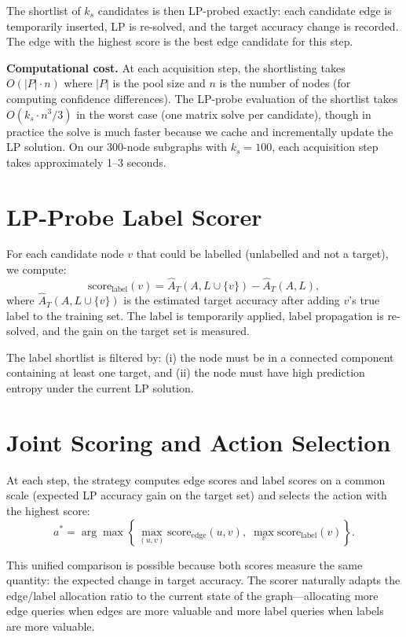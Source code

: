 \documentclass[12pt,a4paper,oneside]{report}
\begin{document}
The shortlist of $k_s$ candidates is then LP-probed exactly: each candidate edge is temporarily inserted, LP is re-solved, and the target accuracy change is recorded. The edge with the highest score is the best edge candidate for this step.

\textbf{Computational cost.} At each acquisition step, the shortlisting takes $O(|P| \cdot n)$ where $|P|$ is the pool size and $n$ is the number of nodes (for computing confidence differences). The LP-probe evaluation of the shortlist takes $O(k_s \cdot n^3 / 3)$ in the worst case (one matrix solve per candidate), though in practice the solve is much faster because we cache and incrementally update the LP solution. On our 300-node subgraphs with $k_s = 100$, each acquisition step takes approximately 1--3 seconds.

\section{LP-Probe Label Scorer}

For each candidate node $v$ that could be labelled (unlabelled and not a target), we compute:
\begin{equation}
    \text{score}_{\text{label}}(v) = \hat{A}_T(A, L \cup \{v\}) - \hat{A}_T(A, L),
\end{equation}
where $\hat{A}_T(A, L \cup \{v\})$ is the estimated target accuracy after adding $v$'s true label to the training set. The label is temporarily applied, label propagation is re-solved, and the gain on the target set is measured.

The label shortlist is filtered by: (i) the node must be in a connected component containing at least one target, and (ii) the node must have high prediction entropy under the current LP solution.

\section{Joint Scoring and Action Selection}

At each step, the strategy computes edge scores and label scores on a common scale (expected LP accuracy gain on the target set) and selects the action with the highest score:
\begin{equation}
    a^* = \arg\max \left\{ \max_{(u,v)} \text{score}_{\text{edge}}(u,v), \; \max_{v} \text{score}_{\text{label}}(v) \right\}.
\end{equation}

This unified comparison is possible because both scores measure the same quantity: the expected change in target accuracy. The scorer naturally adapts the edge/label allocation ratio to the current state of the graph---allocating more edge queries when edges are more valuable and more label queries when labels are more valuable.
\end{document}
